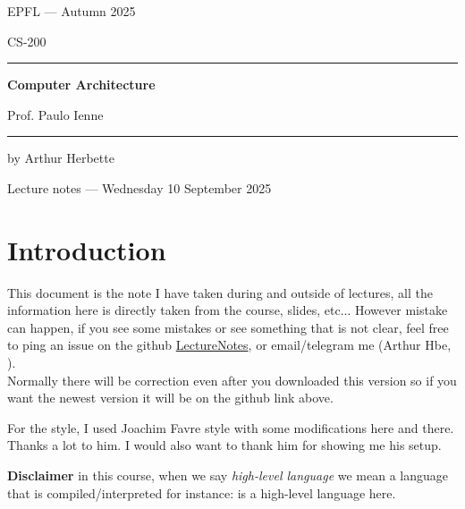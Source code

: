 \documentclass{book}
\renewcommand{\texttt}[1]{\inlinecode{#1}}
\begin{document}
\begin{titlepage}
    \centering
    \vspace*{2cm}
    
    {\large EPFL --- Autumn 2025\par}
    \vspace{0.5cm}
    {\small CS-200\par}
    
    \vspace{2cm}
    \rule{\linewidth}{0.4pt}
    \vspace{0.4cm}
    
    {\huge\bfseries Computer Architecture\par}
    \vspace{0.3cm}
    {\large Prof. Paulo Ienne\par}
    
    \vspace{0.4cm}
    \rule{\linewidth}{0.4pt}
    
    \vfill
    
    {by Arthur Herbette\par}
    \vspace{0.3cm}
    {\small Lecture notes --- Wednesday 10 September 2025\par}
    
    \vspace{2cm}
\end{titlepage}


\tableofcontents
\newpage
\chapter*{Introduction}
This document is the note I have taken during and outside of lectures, all the information here is directly taken from the course, slides, etc... However mistake can happen, if you see some mistakes or see something that is not clear, feel free to ping an issue on the github \href{https://github.com/Arthur926564/LectureNotes}{LectureNotes}, or email/telegram me (Arthur Hbe, ).\\
Normally there will be correction even after you downloaded this version so if you want the newest version it will be on the github link above.

For the style, I used Joachim Favre style with some modifications here and there. Thanks a lot to him. I would also want to thank him for showing me his setup.

\textbf{Disclaimer} in this course, when we say \textit{high-level language} we mean a language that is compiled/interpreted for instance: \texttt{c} is a high-level language here.
\end{document}
